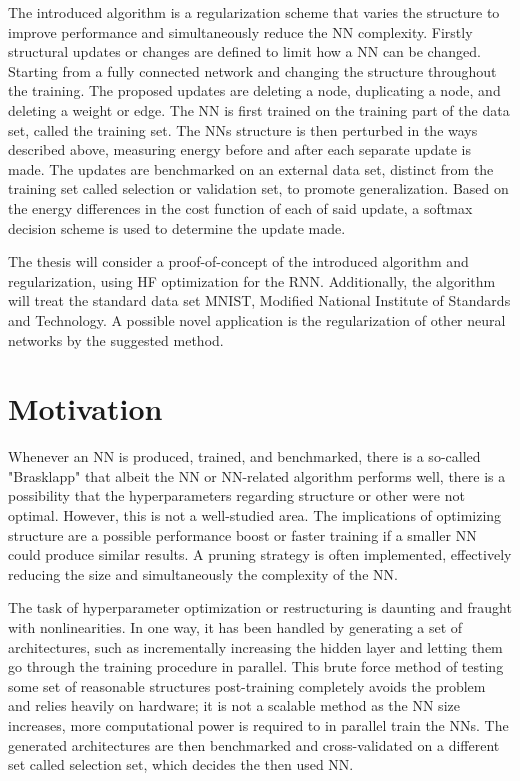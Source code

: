The introduced algorithm is a regularization scheme that varies the structure to improve performance and simultaneously reduce the NN complexity. Firstly structural updates or changes are defined to limit how a NN can be changed. Starting from a fully connected network and changing the structure throughout the training. The proposed updates are deleting a node, duplicating a node, and deleting a weight or edge. The NN is first trained on the training part of the data set, called the training set. The NNs structure is then perturbed in the ways described above, measuring energy before and after each separate update is made. The updates are benchmarked on an external data set, distinct from the training set called selection or validation set, to promote generalization. Based on the energy differences in the cost function of each of said update, a softmax decision scheme is used to determine the update made. 

The thesis will consider a proof-of-concept of the introduced algorithm and regularization, using HF optimization for the RNN. Additionally, the algorithm will treat the standard data set MNIST, Modified National Institute of Standards and Technology\cite{mnist}. A possible novel application is the regularization of other neural networks by the suggested method.

\section{Motivation}

Whenever an NN is produced, trained, and benchmarked, there is a so-called "Brasklapp" that albeit the NN or NN-related algorithm performs well, there is a possibility that the hyperparameters regarding structure or other were not optimal. However, this is not a well-studied area. The implications of optimizing structure are a possible performance boost or faster training if a smaller NN could produce similar results. A pruning strategy is often implemented, effectively reducing the size and simultaneously the complexity of the NN.  

The task of hyperparameter optimization or restructuring is daunting and fraught with nonlinearities. In one way, it has been handled by generating a set of architectures, such as incrementally increasing the hidden layer and letting them go through the training procedure in parallel. This brute force method of testing some set of reasonable structures post-training completely avoids the problem and relies heavily on hardware; it is not a scalable method as the NN size increases, more computational power is required to in parallel train the NNs. The generated architectures are then benchmarked and cross-validated on a different set called selection set, which decides the then used NN. 

